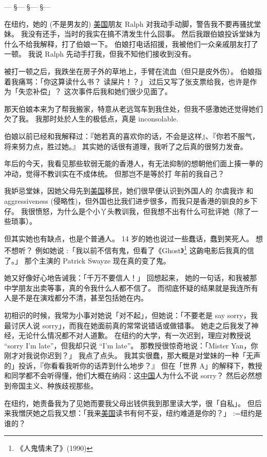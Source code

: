 \documentclass[12pt]{report}
\makeatletter
\renewcommand{\d}[1]{$\underaccent{\scalebox{0.5}{\textbullet}}{\textrm{#1}}$}
\newcommand{\ds}[1]{%
  \@tfor\next:=#1\do{\d{\next}}}
\newcommand*\vignette{\begin{center}\color{blue}  --- \quad \S \quad --- \quad \S \quad --- \quad \S \quad --- \end{center}}
\makeatother
\begin{document}
\vignette

在纽约，她的 (不是男友的) \underline{美国}朋友 Ralph 对我动手动脚，警告我不要再骚扰堂妹。 我没有还手，当时的我实在搞不清发生什么回事。 然后我跟伯娘投诉堂妹为什么不给我解释，打了伯娘一下。 伯娘打电话招援，我被他们一众亲戚朋友打了一顿。 我说 Ralph 先动手打我，但我不知他们接收到没有。

被打一顿之后，我跌坐在房子外的草地上，手臂在流血（但只是皮外伤）。  伯娘指着我痛骂：「你这算读什么书？ 读屎片！？」 过后又写了张支票给我，也许是作为「失恋补偿」？  这次事件后我和她们很少见面了。

那天伯娘本来为了帮我搬家，特意从老远驾车到我住处，但我不感激她还觉得她们欠了我。 我那时处於人生的极低点，真是 inconsolable.

伯娘以前已经和我解释过：『她若真的喜欢你的话，不会是这样』、『你若不服气，将来努力点，胜过她。』 其实她的话很有道理，我听了之后真的很努力发奋。

\resultb 年后的今天，我看见那些软弱无能的香港人，有无法抑制的想朝他们面上揍一拳的冲动，觉得不教训实在不成体统。 但那岂不是等於打 \resultb 年前的我自己？

我妒忌堂妹，因她父母先到\underline{美国}移民，她们很早便认识到外国人的 尔虞我诈 和 aggressiveness (侵略性)，但外国也比我们进步很多，而我只是香港的驯良的乡下仔。 我很愤怒，为什么是个小丫头教训我，但我想不出有什么可批评她（除了一些琐事）。

但其实她也有缺点，也是个普通人。 14 岁的她也说过一些蠢话，蠢到笑死人。 想不想听？ 例如她说 :「我以前不信有鬼，但看了《Ghost》\footnote{《人鬼情未了》(1990)} 这齣电影后我真的信了。」 那个主演的 Patrick Swayze 现在真的变了鬼。

她又好像好心地告诫我：「千万不要信人！」 回想起来， 她的一句话，和我被那中学朋友出卖等事，真的令我什么人都不信了。 而彻底怀疑的结果就是我连所有人是不是在演戏都分不清，甚至包括她在内。

初相识的时候，我常为小事对她说「对不起」，但她说：「不要老是 say sorry，我最讨厌人说 sorry」，而我在她面前真的常常说错话或做错事。  她走之后我发了神经，无论什么情况都不对人道歉。  在纽约的大学，有一次迟到，理应对教授说 ``sorry I'm late''，但我却只说 ``I'm late''。 那教授很惊奇地说：「Mister Yan，你刚才对我说你迟到？」 我点了点头。 我其实很蠢，那大概是对堂妹的一种「无声的」投诉，『你看看我听你的话弄到什么地步？』 但在「世界 A」的解释下，教授和同学都不会听得懂，他们大概在纳闷：这\underline{中国}人为什么不说 sorry？  然后必然想到帝国主义、种族歧视那些。

在纽约，她责备我为了见她而要我父母出钱供我到那里读大学，很「自私」。 但后来我憎厌她之后我又想：「我来\underline{美国}读书有何不妥，纽约难道是你的？」 \ds{纽约是谁的}？
\end{document}
